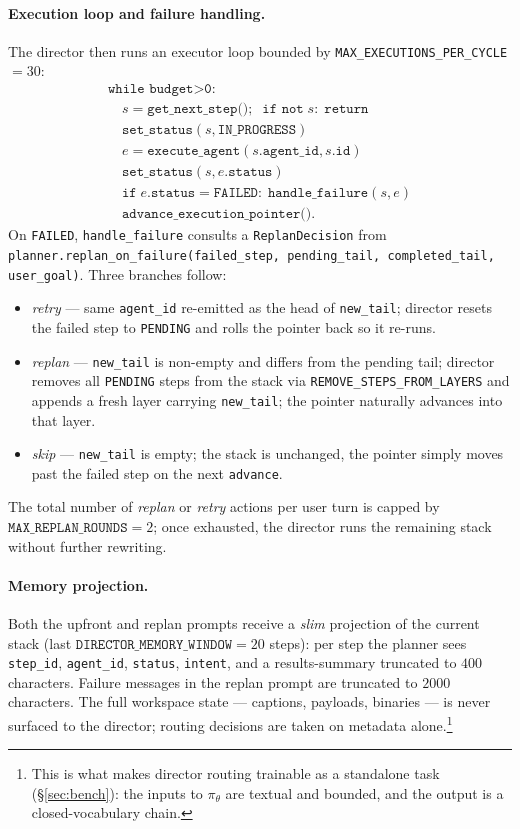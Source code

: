 \paragraph{Execution loop and failure handling.}
The director then runs an executor loop bounded by
\texttt{MAX\_EXECUTIONS\_PER\_CYCLE}$=30$:
\begin{equation*}
\begin{array}{l}
\texttt{while budget>0:}\\
\quad s\!=\!\texttt{get\_next\_step()};\;\;\texttt{if not}\;s\colon\;\texttt{return}\\
\quad \texttt{set\_status}(s,\texttt{IN\_PROGRESS})\\
\quad e\!=\!\texttt{execute\_agent}(s.\texttt{agent\_id},s.\texttt{id})\\
\quad \texttt{set\_status}(s,e.\texttt{status})\\
\quad \texttt{if}\;e.\texttt{status}=\texttt{FAILED}\colon\;\texttt{handle\_failure}(s,e)\\
\quad \texttt{advance\_execution\_pointer()}.
\end{array}
\end{equation*}
On \texttt{FAILED}, \texttt{handle\_failure} consults a
\texttt{ReplanDecision} from
\texttt{planner.replan\_on\_failure(failed\_step, pending\_tail,
completed\_tail, user\_goal)}. Three branches follow:
\begin{itemize}
\item \emph{retry} — same \texttt{agent\_id} re-emitted as the head of
\texttt{new\_tail}; director resets the failed step to \texttt{PENDING}
and rolls the pointer back so it re-runs.
\item \emph{replan} — \texttt{new\_tail} is non-empty and differs from
the pending tail; director removes all \texttt{PENDING} steps from the
stack via \texttt{REMOVE\_STEPS\_FROM\_LAYERS} and appends a fresh
layer carrying \texttt{new\_tail}; the pointer naturally advances into
that layer.
\item \emph{skip} — \texttt{new\_tail} is empty; the stack is
unchanged, the pointer simply moves past the failed step on the next
\texttt{advance}.
\end{itemize}
The total number of \emph{replan} or \emph{retry} actions per user turn
is capped by $\texttt{MAX\_REPLAN\_ROUNDS}\!=\!2$; once exhausted, the
director runs the remaining stack without further rewriting.

\paragraph{Memory projection.}
Both the upfront and replan prompts receive a \emph{slim} projection
of the current stack (last $\texttt{DIRECTOR\_MEMORY\_WINDOW}\!=\!20$
steps): per step the planner sees \texttt{step\_id},
\texttt{agent\_id}, \texttt{status}, \texttt{intent}, and a
results-summary truncated to $400$ characters. Failure messages in the
replan prompt are truncated to $2000$ characters. The full workspace
state — captions, payloads, binaries — is never surfaced to the
director; routing decisions are taken on metadata alone.\footnote{This
is what makes director routing trainable as a standalone task
(\S\ref{sec:bench}): the inputs to $\pi_\theta$ are textual and
bounded, and the output is a closed-vocabulary chain.}
